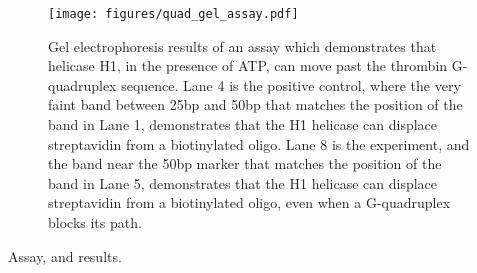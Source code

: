 \begin{figure}[h]
\begin{centering}
\texttt{[image: figures/quad\_gel\_assay.pdf]}
\caption[Stopping helicase: G-quadruplex DNA gel assay]{Gel electrophoresis results of an assay which demonstrates that helicase H1, in the presence of ATP, can move past the thrombin G-quadruplex sequence.  Lane 4 is the positive control, where the very faint band between 25bp and 50bp that matches the position of the band in Lane 1, demonstrates that the H1 helicase can displace streptavidin from a biotinylated oligo.  Lane 8 is the experiment, and the band near the 50bp marker that matches the position of the band in Lane 5, demonstrates that the H1 helicase can displace streptavidin from a biotinylated oligo, even when a G-quadruplex blocks its path.}
\label{fig:quad_gel_assay}
\end{centering}
\end{figure}

Assay, and results.
